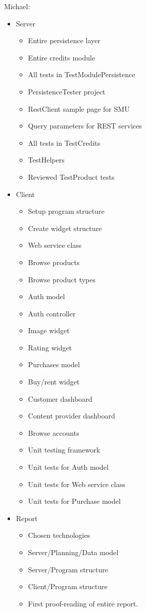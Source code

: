 Michael: 
\begin{itemize}
	\item Server
	\begin{itemize}
		\item Entire persistence layer
		\item Entire credits module
		\item All tests in TestModulePersistence
		\item PersistenceTester project
		\item RestClient sample page for SMU
		\item Query parameters for REST services
		\item All tests in TestCredits
		\item TestHelpers
		\item Reviewed TestProduct tests
	\end{itemize}
	\item Client
	\begin{itemize}
		\item Setup program structure
		\item Create widget structure
		\item Web service class
		\item Browse products
		\item Browse product types
		\item Auth model
		\item Auth controller
		\item Image widget
		\item Rating widget
		\item Purchases model
		\item Buy/rent widget
		\item Customer dashboard
		\item Content provider dashboard
		\item Browse accounts
		\item Unit testing framework
		\item Unit tests for Auth model
		\item Unit tests for Web service class
		\item Unit tests for Purchase model
	\end{itemize}
	\item Report
	\begin{itemize}
		\item Chosen technologies
		\item Server/Planning/Data model
		\item Server/Program structure
		\item Client/Program structure
		\item First proof-reading of entire report.
	\end{itemize}
\end{itemize}